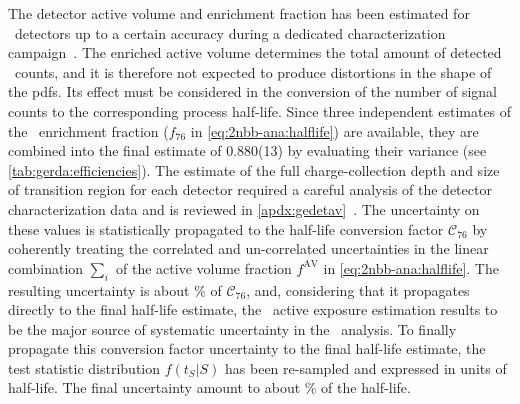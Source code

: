 \begin{description}[wide]
  \item[\gesix\ active exposure] The detector active volume and enrichment fraction has
    been estimated for \bege\ detectors up to a certain accuracy during a dedicated
    characterization campaign~\cite{Agostini2015e, Agostini2019}. The enriched active
    volume determines the total amount of detected \nnbb\ counts, and it is therefore not
    expected to produce distortions in the shape of the pdfs. Its effect must be
    considered in the conversion of the number of signal counts to the corresponding
    process half-life.  Since three independent estimates of the \bege\ enrichment
    fraction ($f_{76}$ in \cref{eq:2nbb-ana:halflife}) are available\cite{Agostini2015e},
    they are combined into the final estimate of 0.880(13) by evaluating their variance
    (see \cref{tab:gerda:efficiencies}). The estimate of the full charge-collection depth
    and size of transition region for each detector required a careful analysis of the
    detector characterization data and is reviewed in
    \cref{apdx:gedetav}~\cite{Agostini2019, Lehnert2016}. The uncertainty on these values
    is statistically propagated to the half-life conversion factor $\mathcal{C}_{76}$ by
    coherently treating the correlated and un-correlated uncertainties in the linear
    combination $\sum_i$ of the active volume fraction $f^\text{AV}$ in
    \cref{eq:2nbb-ana:halflife}. The resulting uncertainty is about \% of
    $\mathcal{C}_{76}$, and, considering that it propagates directly to the final
    half-life estimate, the \gesix\ active exposure estimation results to be the major
    source of systematic uncertainty in the \nnbb\ analysis. To finally propagate this
    conversion factor uncertainty to the final half-life estimate, the test statistic
    distribution $f(t_S|S)$ has been re-sampled and expressed in units of half-life. The
    final uncertainty amount to about \% of the half-life.


\end{description}
